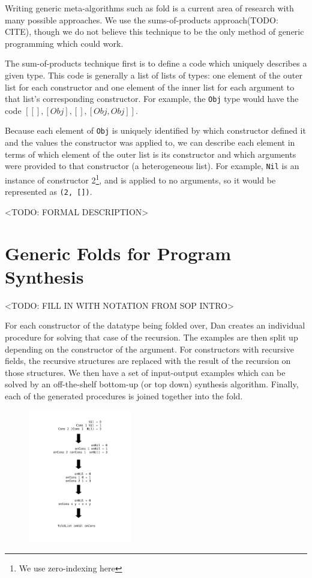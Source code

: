 \documentclass[acmsmall]{acmart}
\begin{document}
Writing generic meta-algorithms such as fold is a current area of research with many possible approaches. We use the sums-of-products approach(TODO: CITE), though we do not believe this technique to be the only method of generic programming which could work. 

The sum-of-products technique first is to define a code which uniquely describes a given type. This code is generally a list of lists of types: one element of the outer list for each constructor and one element of the inner list for each argument to that list's corresponding constructor. For example, the \texttt{Obj} type would have the  code $[[], [Obj], [], [Obj, Obj]]$.

Because each element of \texttt{Obj} is uniquely identified by which constructor defined it and the values the constructor was applied to, we can describe each element in terms of which element of the outer list is its constructor and which arguments were provided to that constructor (a heterogeneous list). For example, \texttt{Nil} is an instance of constructor 2\footnote{We use zero-indexing here}, and is applied to no arguments, so it would be represented as \texttt{(2, [])}. 

<TODO: FORMAL DESCRIPTION>

\section{Generic Folds for Program Synthesis}

<TODO: FILL IN WITH NOTATION FROM SOP INTRO> 

For each constructor of the datatype being folded over, Dan creates an individual procedure for solving that case of the recursion. The examples are then split up depending on the constructor of the argument. For constructors with recursive fields, the recursive structures are replaced with the result of the recursion on those structures. We then have a set of input-output examples which can be solved by an off-the-shelf bottom-up (or top down) synthesis algorithm. Finally, each of the generated procedures is joined together into the fold.

\begin{figure}
\includegraphics[width=0.4\textwidth]{Diagram.pdf}
\end{figure}
\end{document}
